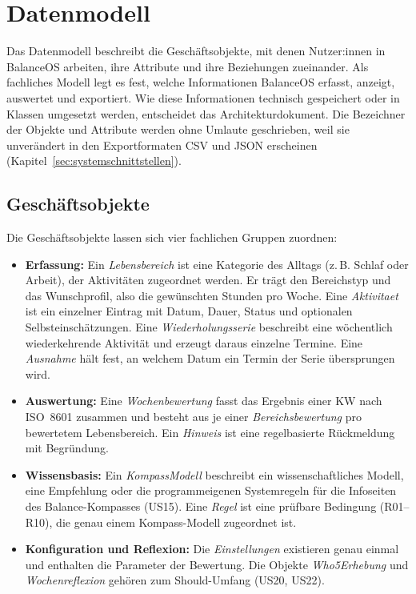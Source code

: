 \section{Datenmodell}
Das Datenmodell beschreibt die Geschäftsobjekte, mit denen Nutzer:innen in BalanceOS arbeiten, ihre Attribute und ihre Beziehungen zueinander. Als fachliches Modell legt es fest, welche Informationen BalanceOS erfasst, anzeigt, auswertet und exportiert. Wie diese Informationen technisch gespeichert oder in Klassen umgesetzt werden, entscheidet das Architekturdokument. Die Bezeichner der Objekte und Attribute werden ohne Umlaute geschrieben, weil sie unverändert in den Exportformaten \ac{CSV} und \ac{JSON} erscheinen (Kapitel~\ref{sec:systemschnittstellen}).

\subsection{Geschäftsobjekte}\label{sec:geschaeftsobjekte}
Die Geschäftsobjekte lassen sich vier fachlichen Gruppen zuordnen:
\begin{itemize}
  \item \textbf{Erfassung:} Ein \emph{Lebensbereich} ist eine Kategorie des Alltags (z.\,B. Schlaf oder Arbeit), der Aktivitäten zugeordnet werden. Er trägt den Bereichstyp und das Wunschprofil, also die gewünschten Stunden pro Woche. Eine \emph{Aktivitaet} ist ein einzelner Eintrag mit Datum, Dauer, Status und optionalen Selbsteinschätzungen. Eine \emph{Wiederholungsserie} beschreibt eine wöchentlich wiederkehrende Aktivität und erzeugt daraus einzelne Termine. Eine \emph{Ausnahme} hält fest, an welchem Datum ein Termin der Serie übersprungen wird.
  \item \textbf{Auswertung:} Eine \emph{Wochenbewertung} fasst das Ergebnis einer \ac{KW} nach \ac{ISO}~8601 zusammen und besteht aus je einer \emph{Bereichsbewertung} pro bewertetem Lebensbereich. Ein \emph{Hinweis} ist eine regelbasierte Rückmeldung mit Begründung.
  \item \textbf{Wissensbasis:} Ein \emph{KompassModell} beschreibt ein wissenschaftliches Modell, eine Empfehlung oder die programmeigenen Systemregeln für die Infoseiten des Balance-Kompasses (US15). Eine \emph{Regel} ist eine prüfbare Bedingung (R01--R10), die genau einem Kompass-Modell zugeordnet ist.
  \item \textbf{Konfiguration und Reflexion:} Die \emph{Einstellungen} existieren genau einmal und enthalten die Parameter der Bewertung. Die Objekte \emph{Who5Erhebung} und \emph{Wochenreflexion} gehören zum Should-Umfang (US20, US22).
\end{itemize}

